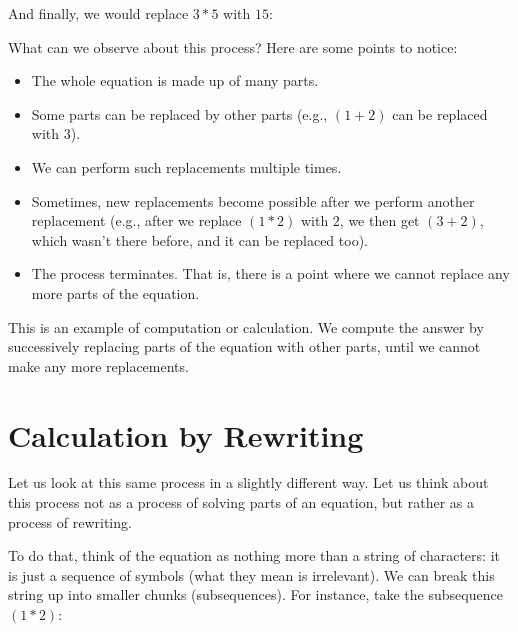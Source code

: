 \documentclass{book}
\numberwithin{equation}{chapter}
\begin{document}
\noindent
And finally, we would replace $3 * 5$ with $15$:

\begin{center}
\end{center}

\noindent
What can we observe about this process? Here are some points to notice:

\begin{itemize}
\item{The whole equation is made up of many parts.}
\item{Some parts can be replaced by other parts (e.g., $(1 + 2)$ can be replaced with $3$).}
\item{We can perform such replacements multiple times.}
\item{Sometimes, new replacements become possible after we perform another replacement (e.g., after we replace $(1 * 2)$ with $2$, we then get $(3 + 2)$, which wasn't there before, and it can be replaced too).}
\item{The process terminates. That is, there is a point where we cannot replace any more parts of the equation.}
\end{itemize}

\noindent
This is an example of computation or calculation. We compute the answer by successively replacing parts of the equation with other parts, until we cannot make any more replacements.


\section{Calculation by Rewriting}

Let us look at this same process in a slightly different way. Let us think about this process not as a process of solving parts of an equation, but rather as a process of rewriting. 

To do that, think of the equation as nothing more than a string of characters: it is just a sequence of symbols (what they mean is irrelevant). We can break this string up into smaller chunks (subsequences). For instance, take the subsequence $(1 * 2)$:
\end{document}
